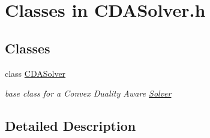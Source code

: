 \hypertarget{group___c_d_a_solver___c_l_a_s_s_e_s}{}\section{Classes in C\+D\+A\+Solver.\+h}
\label{group___c_d_a_solver___c_l_a_s_s_e_s}
\subsection*{Classes}
\begin{DoxyCompactItemize}
\item 
class \mbox{\hyperlink{class_s_m_spp__di__unipi__it_1_1_c_d_a_solver}{C\+D\+A\+Solver}}
\begin{DoxyCompactList}\small\item\em base class for a Convex Duality Aware \mbox{\hyperlink{class_s_m_spp__di__unipi__it_1_1_solver}{Solver}} \end{DoxyCompactList}\end{DoxyCompactItemize}


\subsection{Detailed Description}
